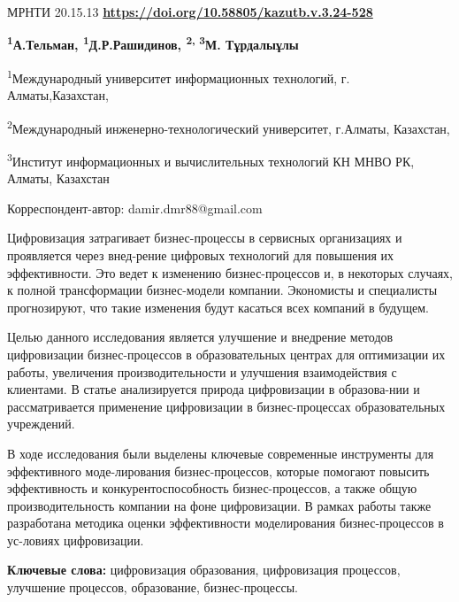 \newpage
 МРНТИ 20.15.13
\hfill {\bfseries \href{https://doi.org/10.58805/kazutb.v.3.24-528}{https://doi.org/10.58805/kazutb.v.3.24-528}}


\begin{center}


{\bfseries \textsuperscript{1}А.Тельман, \textsuperscript{1}Д.Р.Рашидинов\envelope, \textsuperscript{2, 3}М. Тұрдалыұлы}

\textsuperscript{1}Международный университет информационных технологий, г. Алматы,Казахстан,

\textsuperscript{2}Международный инженерно-технологический университет, г.Алматы, Казахстан,

\textsuperscript{3}Институт информационных и вычислительных технологий КН МНВО РК, Алматы, Казахстан
\end{center}
\envelope Корреспондент-автор: damir.dmr88@gmail.com\vspace{0.5cm}

Цифровизация затрагивает бизнес-процессы в сервисных организациях и
проявляется через внед-рение цифровых технологий для повышения их
эффективности. Это ведет к изменению бизнес-процессов и, в некоторых
случаях, к полной трансформации бизнес-модели компании. Экономисты и
специалисты прогнозируют, что такие изменения будут касаться всех
компаний в будущем.

Целью данного исследования является улучшение и внедрение методов
цифровизации бизнес-процессов в образовательных центрах для оптимизации
их работы, увеличения производительности и улучшения взаимодействия с
клиентами. В статье анализируется природа цифровизации в образова-нии и
рассматривается применение цифровизации в бизнес-процессах
образовательных учреждений.

В ходе исследования были выделены ключевые современные инструменты для
эффективного моде-лирования бизнес-процессов, которые помогают повысить
эффективность и конкурентоспособность бизнес-процессов, а также общую
производительность компании на фоне цифровизации. В рамках работы также
разработана методика оценки эффективности моделирования бизнес-процессов
в ус-ловиях цифровизации.

{\bfseries Ключевые слова:} цифровизация образования, цифровизация
процессов, улучшение процессов, образование, бизнес-процессы.


